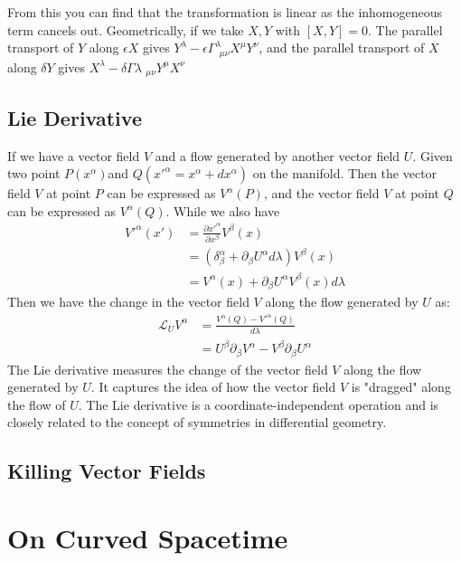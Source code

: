\documentclass{article}
\begin{document}
From this you can find that the transformation is linear as the inhomogeneous term cancels out. Geometrically, if we take $X,Y$ with $[X,Y]=0$. The parallel transport of $Y$ along $\epsilon X$ gives $Y^\lambda - \epsilon \Gamma^\lambda _{~~\mu\nu} X^\mu Y^\nu$, and the parallel transport of $X$ along $\delta Y$ gives $X^\lambda - \delta \Gamma\lambda_{~~\mu\nu}Y^\mu X^\nu$
\subsection{Lie Derivative}

If we have a vector field $V$ and a flow generated by another vector field $U$. Given two point $P (x^\alpha) $and $Q (x'^\alpha = x^\alpha + dx^\alpha)$ on the manifold. Then the vector field $V$ at point $P$ can be expressed as $V^\alpha(P)$, and the vector field $V$ at point $Q$ can be expressed as $V^\alpha(Q)$. While we also have
\begin{equation}
    \begin{split}
    V'^\alpha(x') &= \frac{\partial x'^\alpha}{\partial x^\beta}V^\beta(x)\\
    &=(\delta^\alpha_\beta+\partial_\beta U^\alpha d\lambda) V^\beta(x)\\
    &=V^\alpha(x)+\partial_\beta U^\alpha V^\beta(x)d\lambda
    \end{split}
\end{equation}
Then we have the change in the vector field $V$ along the flow generated by $U$ as:
\begin{equation}
\begin{split}
\mathcal{L}_U V^\alpha &= \frac{V^\alpha(Q) - V'^\alpha(Q)}{d\lambda} \\
    &=U^\beta \partial_\beta V^\alpha - V^\beta \partial_\beta U^\alpha
\end{split}
\end{equation}
The Lie derivative measures the change of the vector field $V$ along the flow generated by $U$. It captures the idea of how the vector field $V$ is "dragged" along the flow of $U$. The Lie derivative is a coordinate-independent operation and is closely related to the concept of symmetries in differential geometry.

\subsection{Killing Vector Fields}

\section{On Curved Spacetime}
\end{document}
